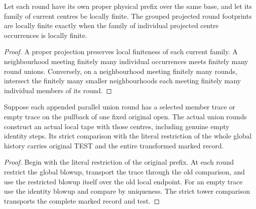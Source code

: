 \begin{proposition}
\label{hir:g8-projected-round-grouping}
\leanok
Let each round have its own proper physical prefix over the same
base, and let its family of current centres be locally finite.
The grouped projected round footprints are locally finite exactly
when the family of individual projected centre occurrences is
locally finite.
\end{proposition}
\begin{proof}
A proper projection preserves local finiteness of each current
family. A neighbourhood meeting finitely many individual
occurrences meets finitely many round unions. Conversely, on a
neighbourhood meeting finitely many rounds, intersect the finitely
many smaller neighbourhoods each meeting finitely many individual
members of its round.
\end{proof}

\begin{theorem}
\label{hir:g8-finite-parallel-tape-readback}
\leanok
Suppose each appended parallel union round has a selected member
trace or empty trace on the pullback of one fixed original open.
The actual union rounds construct an actual local tape with those
centres, including genuine empty identity steps. Its strict
comparison with the literal restriction of the whole global
history carries original TEST and the entire transformed marked
record.
\end{theorem}
\begin{proof}
Begin with the literal restriction of the original prefix. At each
round restrict the global blowup, transport the trace through the
old comparison, and use the restricted blowup itself over the old
local endpoint. For an empty trace use the identity blowup and
compare by uniqueness. The strict tower comparison transports the
complete marked record and test.
\end{proof}

